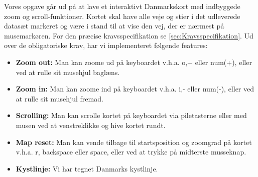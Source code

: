 Vores opgave går ud på at lave et interaktivt Danmarkskort med indbyggede zoom og scroll-funktioner. Kortet skal have alle veje og stier i det udleverede datasæt markeret og være i stand til at vise den vej, der er nærmest på musemarkøren. For den præcise kravsspecifikation se \ref{sec:Kravsspecifikation}.
\newline \newline
Ud over de obligatoriske krav, har vi implementeret følgende features:
\begin{itemize}
	\item \textbf{Zoom out:} Man kan zoome ud på keyboardet v.h.a. o,+ eller num(+), eller ved at rulle sit musehjul baglæns.
	\item \textbf{Zoom in:} Man kan zoome ind på keyboardet v.h.a. i,- eller num(-), eller ved at rulle sit musehjul fremad.
	\item \textbf{Scrolling:} Man kan scrolle kortet på keyboardet via piletasterne eller med musen ved at venstreklikke og hive kortet rundt.
	\item \textbf{Map reset:} Man kan vende tilbage til startsposition og zoomgrad på kortet v.h.a. r, backspace eller space, eller ved at trykke på midterste musseknap.
	\item \textbf{Kystlinje:} Vi har tegnet Danmarks kystlinje.
\end{itemize}